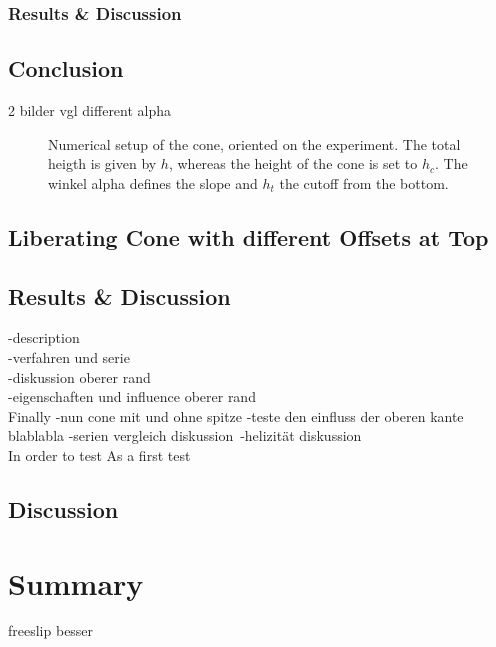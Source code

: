 \subsubsection{Results \& Discussion}


\subsection{Conclusion}
2 bilder vgl different alpha

\begin{figure}[!bp]
      \centering
      \caption{Numerical setup of the cone, oriented on the experiment. The total heigth
         is given by $h$, whereas the height of the cone is set to $h_c$.
      The winkel alpha defines the slope and $h_t$ the cutoff from the bottom.}
      \label{cone:theorie}
\end{figure}


\clearpage

\subsection{Liberating Cone with different Offsets at Top}
\subsection{Results \& Discussion}

-description\\
-verfahren und serie\\
-diskussion oberer rand\\
-eigenschaften und influence oberer rand \\


Finally
-nun cone mit und ohne spitze
-teste den einfluss der oberen kante blablabla
-serien vergleich diskussion\
-helizität diskussion\\

In order to test
As a first test

\subsection{Discussion}


\section{Summary}

freeslip besser




